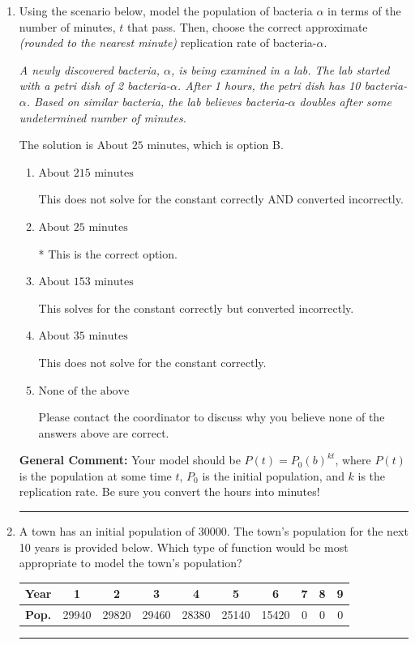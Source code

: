 \documentclass{extbook}[14pt]
\newcommand{\litem}[1]{\item #1

\rule{\textwidth}{0.4pt}}
\begin{document}
\begin{enumerate}\litem{
Using the scenario below, model the population of bacteria $\alpha$ in terms of the number of minutes, $t$ that pass. Then, choose the correct approximate \textit{(rounded to the nearest minute)} replication rate of bacteria-$\alpha$.

\begin{center}
    \textit{ A newly discovered bacteria, $\alpha$, is being examined in a lab. The lab started with a petri dish of 2 bacteria-$\alpha$. After 1 hours, the petri dish has 10 bacteria-$\alpha$. Based on similar bacteria, the lab believes bacteria-$\alpha$ doubles after some undetermined number of minutes. }
\end{center}


The solution is \( \text{About } 25 \text{ minutes} \), which is option B.\begin{enumerate}[label=\Alph*.]
\item \( \text{About } 215 \text{ minutes} \)

This does not solve for the constant correctly AND converted incorrectly.
\item \( \text{About } 25 \text{ minutes} \)

* This is the correct option.
\item \( \text{About } 153 \text{ minutes} \)

This solves for the constant correctly but converted incorrectly.
\item \( \text{About } 35 \text{ minutes} \)

This does not solve for the constant correctly.
\item \( \text{None of the above} \)

Please contact the coordinator to discuss why you believe none of the answers above are correct.
\end{enumerate}

\textbf{General Comment:} Your model should be $P(t) = P_0(b)^{kt}$, where $P(t)$ is the population at some time $t$, $P_0$ is the initial population, and $k$ is the replication rate. Be sure you convert the hours into minutes!
}
\litem{
A town has an initial population of 30000. The town's population for the next 10 years is provided below. Which type of function would be most appropriate to model the town's population?



\begin{tabular}{c|c|c|c|c|c|c|c|c|c}
\textbf{Year} & 1 & 2 & 3 & 4 & 5 & 6 & 7 & 8 & 9 \tabularnewline
\hline
\textbf{Pop.} & 29940 & 29820 & 29460 & 28380 & 25140 & 15420 & 0 & 0 & 0
\end{tabular} 

}
\end{enumerate}
\end{document}
